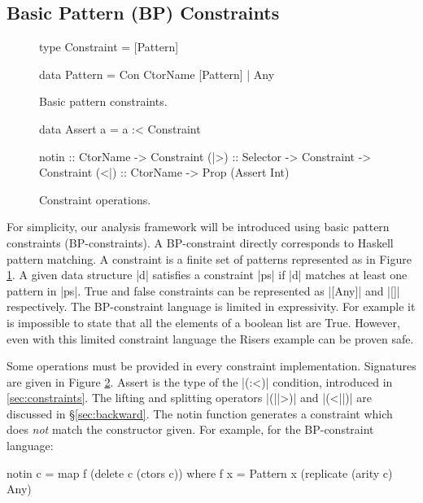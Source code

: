\documentclass[preprint]{sigplanconf}
\newcommand{\C}[1]{\textsf{#1}}
\begin{document}
\subsection{Basic Pattern (BP) Constraints}
\label{sec:basic}

\begin{figure}
\begin{code}
type Constraint = [Pattern]

data Pattern  =  Con CtorName [Pattern]
              |  Any
\end{code}
\caption{Basic pattern constraints.}
\label{fig:basic}
\end{figure}

\begin{figure}
\begin{code}
data Assert a = a :< Constraint

notin :: CtorName -> Constraint
(|>) :: Selector -> Constraint -> Constraint
(<|) :: CtorName -> Prop (Assert Int)
\end{code}
\caption{Constraint operations.}
\label{fig:constraint}
\end{figure}

For simplicity, our analysis framework will be introduced using basic pattern constraints (BP-constraints). A BP-constraint directly corresponds to Haskell pattern matching. A constraint is a finite set of patterns represented as in Figure \ref{fig:basic}. A given data structure |d| satisfies a constraint |ps| if |d| matches at least one pattern in |ps|. True and false constraints can be represented as |[Any]| and |[]| respectively. The BP-constraint language is limited in expressivity. For example it is impossible to state that all the elements of a boolean list are True. However, even with this limited constraint language the Risers example can be proven safe.

Some operations must be provided in every constraint implementation. Signatures are given in Figure \ref{fig:constraint}. \C{Assert} is the type of the |(:<)| condition, introduced in \ref{sec:constraints}. The lifting and splitting operators |(||>)| and |(<||)| are discussed in \S\ref{sec:backward}. The \C{notin} function generates a constraint which does \textit{not} match the constructor given. For example, for the BP-constraint language:

\begin{code}
notin c = map f (delete c (ctors c))
   where f x = Pattern x (replicate (arity c) Any)
\end{code}
\end{document}
